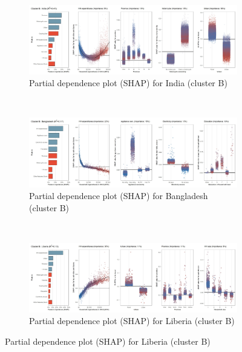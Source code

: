 \begin{figure}[ht!]\ContinuedFloat
    \centering
   \begin{subfigure}[b]{\textwidth}
         \centering
         \caption{Partial dependence plot (SHAP) for India (cluster B)}
         \label{fig:5b_India}
         \includegraphics[width=\textwidth]{Figure 5b/Figure_5b_IND}         
     \end{subfigure}
    \\
    \vspace{0.5cm}
   \begin{subfigure}[b]{\textwidth}
         \centering
         \caption{Partial dependence plot (SHAP) for Bangladesh (cluster B)}
         \label{fig:5b_BGD}
         \includegraphics[width=\textwidth]{Figure 5b/Figure_5b_BGD}         
     \end{subfigure}
    \\
    \vspace{0.5cm}
   \begin{subfigure}[b]{\textwidth}
         \centering
         \caption{Partial dependence plot (SHAP) for Liberia (cluster B)}
         \label{fig:5b_LBR}
         \includegraphics[width=\textwidth]{Figure 5b/Figure_5b_LBR}

\end{subfigure}
\end{figure}

